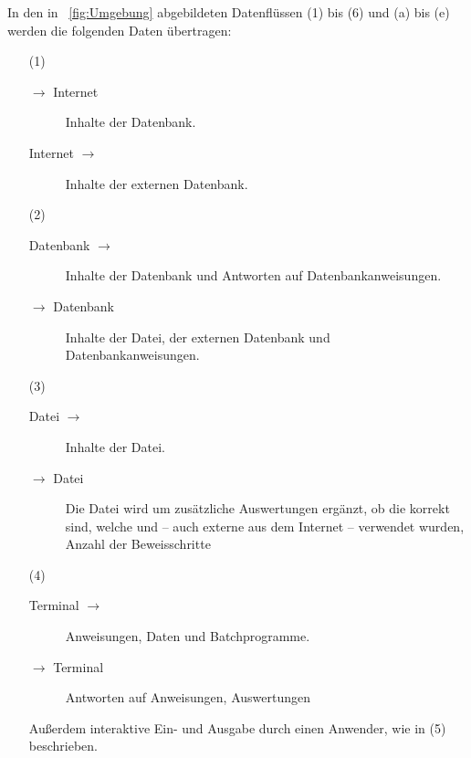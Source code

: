 In den in \figurename~\vref{fig:Umgebung} abgebildeten Datenflüssen (1) bis
(6) und (a) bis (e) werden die folgenden Daten übertragen:
\begin{itemize}
	\newcommand*{\vonnach}[2]{#1 $\rightarrow$ #2}
	\newcommand*{\nachvon}[2]{\vonnach{#2}{#1}}
	\newcommand*{\hinundher}[2]{#1 $\leftrightarrow$ #2}
	
	\item[(1)]\label{dat:Internet}
	\begin{description}
		\item[\vonnach{\ASBA}{Internet}]\label{dat:ausInternet}
		Inhalte der Datenbank.
		\item[\nachvon{\ASBA}{Internet}]\label{dat:inInternet}
		Inhalte der externen Datenbank.
	\end{description}
	
	\item[(2)]\label{dat:Datenbank}
	\begin{description}
		\item[\vonnach{Datenbank}{\ASBA}]\label{dat:ausDatenbank}
		Inhalte der Datenbank und Antworten auf Datenbankanweisungen.
		\item[\nachvon{Datenbank}{\ASBA}]\label{dat:inDatenbank}
		Inhalte der Datei, der externen Datenbank und Datenbankanweisungen.
	\end{description}
	
	\item[(3)]\label{dat:Datei}
	\begin{description}
		\item[\vonnach{Datei}{\ASBA}]\label{dat:ausDatei}
		Inhalte der Datei.
		\item[\nachvon{Datei}{\ASBA}]\label{dat:inDatei}
		Die Datei wird um zusätzliche Auswertungen ergänzt, \textzB ob die  korrekt sind, welche  und  -- auch externe aus dem Internet -- verwendet wurden, Anzahl der Beweisschritte \textusw
	\end{description}
	
	\item[(4)]\label{dat:Terminal}
	\begin{description}
		\item[\vonnach{Terminal}{\ASBA}]\label{dat:ausTerminal}
		Anweisungen, Daten und Batchprogramme.
		\item[\nachvon{Terminal}{\ASBA}]\label{dat:inTerminal}
		Antworten auf Anweisungen, Auswertungen \textusw
	\end{description}
	Außerdem interaktive Ein- und Ausgabe durch einen Anwender, wie in (5) beschrieben.
	

\end{itemize}
